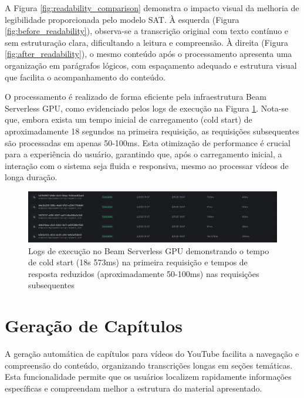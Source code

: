\documentclass[tcc,capa]{texufpel}
\begin{document}
A Figura \ref{fig:readability_comparison} demonstra o impacto visual da melhoria de legibilidade proporcionada pelo modelo SAT. À esquerda (Figura \ref{fig:before_readability}), observa-se a transcrição original com texto contínuo e sem estruturação clara, dificultando a leitura e compreensão. À direita (Figura \ref{fig:after_readability}), o mesmo conteúdo após o processamento apresenta uma organização em parágrafos lógicos, com espaçamento adequado e estrutura visual que facilita o acompanhamento do conteúdo.

O processamento é realizado de forma eficiente pela infraestrutura Beam Serverless GPU, como evidenciado pelos logs de execução na Figura \ref{fig:beam_logs_cold_start}. Nota-se que, embora exista um tempo inicial de carregamento (cold start) de aproximadamente 18 segundos na primeira requisição, as requisições subsequentes são processadas em apenas 50-100ms. Esta otimização de performance é crucial para a experiência do usuário, garantindo que, após o carregamento inicial, a interação com o sistema seja fluida e responsiva, mesmo ao processar vídeos de longa duração.

\begin{figure}[H]
  \centering
  \includegraphics[width=\textwidth,height=0.45\textheight,keepaspectratio]{exemplo-slides/graphics/images/logs-beam.png}
  \caption{Logs de execução no Beam Serverless GPU demonstrando o tempo de cold start (18s 573ms) na primeira requisição e tempos de resposta reduzidos (aproximadamente 50-100ms) nas requisições subsequentes}
  \label{fig:beam_logs_cold_start}
\end{figure}

\section{Gera\c{c}\~{a}o de Cap\'{i}tulos}

A geração automática de capítulos para vídeos do YouTube facilita a navegação e compreensão do conteúdo, organizando transcrições longas em seções temáticas. Esta funcionalidade permite que os usuários localizem rapidamente informações específicas e compreendam melhor a estrutura do material apresentado.
\end{document}
